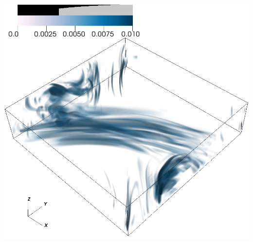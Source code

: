 \documentclass[30pt, blockverticalspace=1cm]{tikzposter}
\begin{document}
\begin{columns}
{\begin{center}
        \includegraphics[width=.85\linewidth]{images/chi_Om10_vr2.png}
    \emp


\end{center}}
\end{columns}
\end{document}
